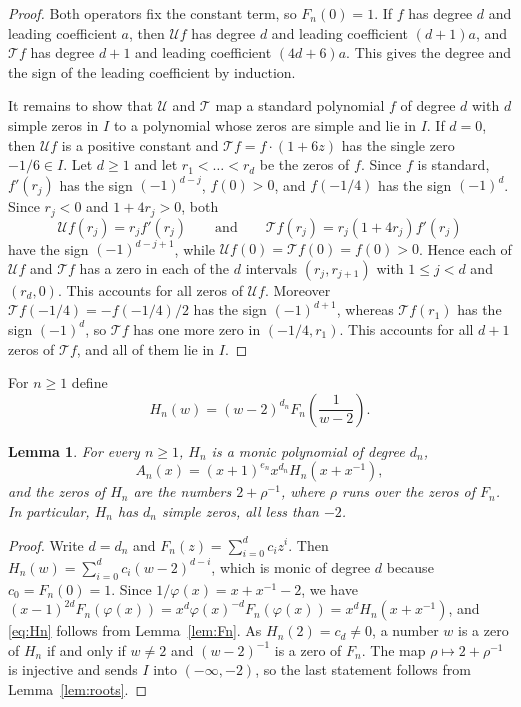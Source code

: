 \documentclass{amsart}
\newtheorem{lemma}[theorem]{Lemma}
\theoremstyle{remark}
\numberwithin{equation}{section}
\newcommand{\cU}{\mathcal{U}}
\newcommand{\cT}{\mathcal{T}}
\begin{document}
\begin{proof}
Both operators fix the constant term, so $F_n(0)=1$. If $f$ has degree $d$
and leading coefficient $a$, then $\cU f$ has degree $d$ and leading coefficient
$(d+1)a$, and $\cT f$ has degree $d+1$ and leading coefficient $(4d+6)a$. This
gives the degree and the sign of the leading coefficient by induction.

It remains to show that $\cU$ and $\cT$ map a standard polynomial $f$ of degree
$d$ with $d$ simple zeros in $I$ to a polynomial whose zeros are simple and
lie in $I$. If $d=0$, then $\cU f$ is a positive constant and $\cT f=f\cdot(1+6z)$
has the single zero $-1/6\in I$. Let $d\ge 1$ and let $r_1<\dots<r_d$ be the
zeros of $f$. Since $f$ is standard, $f'(r_j)$ has the sign $(-1)^{d-j}$,
$f(0)>0$, and $f(-1/4)$ has the sign $(-1)^d$. Since
$r_j<0$ and $1+4r_j>0$, both
\[
\cU f(r_j)=r_jf'(r_j)\qquad\text{and}\qquad \cT f(r_j)=r_j(1+4r_j)f'(r_j)
\]
have the sign $(-1)^{d-j+1}$, while $\cU f(0)=\cT f(0)=f(0)>0$. Hence each of $\cU f$
and $\cT f$ has a zero in each of the $d$ intervals $(r_j,r_{j+1})$ with
$1\le j<d$ and $(r_d,0)$. This accounts for all zeros of $\cU f$. Moreover
$\cT f(-1/4)=-f(-1/4)/2$ has the sign $(-1)^{d+1}$, whereas $\cT f(r_1)$ has the
sign $(-1)^d$, so $\cT f$ has one more zero in $(-1/4,r_1)$. This accounts for
all $d+1$ zeros of $\cT f$, and all of them lie in $I$.
\end{proof}

For $n\ge 1$ define
\[
H_n(w)=(w-2)^{d_n}F_n\!\left(\frac{1}{w-2}\right).
\]

\begin{lemma}\label{lem:Hn}
For every $n\ge 1$, $H_n$ is a monic polynomial of degree $d_n$,
\begin{equation}\label{eq:Hn}
A_n(x)=(x+1)^{e_n}x^{d_n}H_n(x+x^{-1}),
\end{equation}
and the zeros of $H_n$ are the numbers $2+\rho^{-1}$, where $\rho$ runs over
the zeros of $F_n$. In particular, $H_n$ has $d_n$ simple zeros, all less
than $-2$.
\end{lemma}

\begin{proof}
Write $d=d_n$ and $F_n(z)=\sum_{i=0}^{d}c_iz^i$. Then
$H_n(w)=\sum_{i=0}^{d}c_i(w-2)^{d-i}$, which is monic of degree $d$ because
$c_0=F_n(0)=1$. Since $1/\varphi(x)=x+x^{-1}-2$, we have
$(x-1)^{2d}F_n(\varphi(x))=x^d\varphi(x)^{-d}F_n(\varphi(x))
=x^dH_n(x+x^{-1})$, and \eqref{eq:Hn} follows from Lemma~\ref{lem:Fn}. As
$H_n(2)=c_d\ne 0$, a number $w$ is a zero of $H_n$ if and only if $w\ne 2$
and $(w-2)^{-1}$ is a zero of $F_n$. The map $\rho\mapsto 2+\rho^{-1}$ is
injective and sends $I$ into $(-\infty,-2)$, so the last statement follows
from Lemma~\ref{lem:roots}.
\end{proof}
\end{document}
